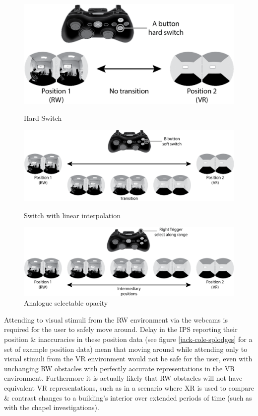 \documentclass[conference]{acmsiggraph}
\begin{document}
\begin{figure}[t]
	\centering
	\begin{minipage}[t]{\linewidth}
		\centering
		\includegraphics[width=\linewidth]{images/switching-hard-with-controller.png}
		\caption{Hard Switch} 
		\label{scenario1}
	\end{minipage}
	\begin{minipage}[t]{\linewidth}
		\centering
		\includegraphics[width=\linewidth]{images/switching-soft-with-controller.png}
		\caption{Switch with linear interpolation} 
		\label{scenario12}
	\end{minipage}
	\begin{minipage}[t]{\linewidth}
		\centering
		\includegraphics[width=\linewidth]{images/switching-analogue-with-controller.png}
		\caption{Analogue selectable opacity} 
		\label{scenario2}
	\end{minipage}
\end{figure}

Attending to visual stimuli from the RW environment via the webcams is required for the user to safely move around. Delay in the IPS reporting their position \& inaccuracies in these position data (see figure \ref{jack-cole-splodges} for a set of example position data) mean that moving around while attending only to visual stimuli from the VR environment would not be safe for the user, even with unchanging RW obstacles with perfectly accurate representations in the VR environment. Furthermore it is actually likely that RW obstacles will not have equivalent VR representations, such as in a scenario where XR is used to compare \& contrast changes to a building's interior over extended periods of time (such as with the chapel investigations).
\end{document}
